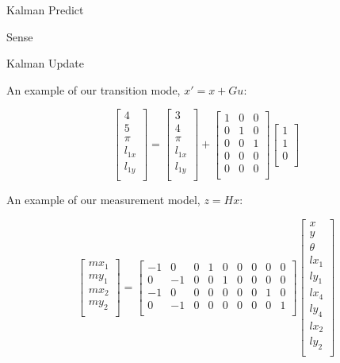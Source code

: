 \documentclass[prodmode,acmtecs]{acmsmall} %
\begin{document}
Kalman Predict

Sense

Kalman Update




An example of our transition mode, $x' = x + Gu$:


$$
\begin{bmatrix}
    4 \\
    5 \\
    \pi \\
    l_{1x} \\
    l_{1y} \\
\end{bmatrix}
=
\begin{bmatrix}
    3 \\
    4 \\
    \pi  \\
    l_{1x} \\
    l_{1y} \\
\end{bmatrix}
+
\begin{bmatrix}
    1 & 0 & 0  \\
    0 & 1 & 0  \\
    0 & 0 & 1  \\
    0 & 0 & 0  \\
    0 & 0 & 0  \\
\end{bmatrix}
\begin{bmatrix}
    1 \\
    1 \\
    0 \\
\end{bmatrix}
$$

An example of our measurement model, $z = Hx$:

$$
\begin{bmatrix}
    mx_1 \\
    my_1 \\
    mx_2 \\
    my_2 \\
\end{bmatrix}
=
\begin{bmatrix}
    -1 & 0 & 0 & 1 & 0 & 0 & 0 & 0 & 0 \\
    0 & -1 & 0 & 0 & 1 & 0 & 0 & 0 & 0 \\
    -1 & 0 & 0 & 0 & 0 & 0 & 0 & 1 & 0 \\
    0 & -1 & 0 & 0 & 0 & 0 & 0 & 0 & 1 \\
\end{bmatrix}
\begin{bmatrix}
    x \\
    y \\
    \theta \\
    lx_1 \\
    ly_1 \\
    lx_4 \\
    ly_4 \\
    lx_2 \\
    ly_2 \\
\end{bmatrix}
$$
\end{document}
